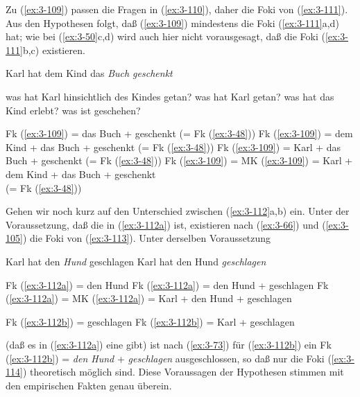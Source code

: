 \documentclass[output=paper]{langsci/langscibook}
\begin{document}
Zu (\ref{ex:3-109}) passen die Fragen in (\ref{ex:3-110}), daher die Foki von (\ref{ex:3-111}). Aus den
Hypothesen folgt, daß (\ref{ex:3-109}) mindestens die Foki (\ref{ex:3-111}a,d) hat; wie bei (\ref{ex:3-50}c,d) wird auch hier nicht vorausgesagt, daß die
Foki (\ref{ex:3-111}b,c) existieren.
\begin{exe}
\ex
\label{ex:3-109}
Karl hat dem Kind das \textit{Buch geschenkt}
\ex
\label{ex:3-110}
\begin{xlist}
\ex
\label{ex:3-110a}
was hat Karl hinsichtlich des Kindes getan?
\ex
\label{ex:3-110b}
was hat Karl getan?
\ex
\label{ex:3-110c}
was hat das Kind erlebt?
\ex
\label{ex:3-110d}
was ist geschehen?
\end{xlist}
\ex
\label{ex:3-111}
\begin{xlist}
\ex
\label{ex:3-111a}
Fk (\ref{ex:3-109}) = das Buch + geschenkt (= Fk (\ref{ex:3-48}))
\ex
\label{ex:3-111b}
Fk (\ref{ex:3-109}) = dem Kind + das Buch + geschenkt (= Fk (\ref{ex:3-48}))
\ex
\label{ex:3-111c}
Fk (\ref{ex:3-109}) = Karl + das Buch + geschenkt (= Fk (\ref{ex:3-48}))
\ex
\label{ex:3-111d}
Fk (\ref{ex:3-109}) = MK (\ref{ex:3-109}) = Karl + dem Kind + das Buch + geschenkt\\
 (= Fk (\ref{ex:3-48}))
\end{xlist}
\end{exe}
Gehen wir noch kurz auf den Unterschied zwischen (\ref{ex:3-112}a,b) ein. Unter
der Voraussetzung, daß die  in (\ref{ex:3-112a})  ist,
existieren nach (\ref{ex:3-66}) und (\ref{ex:3-105}) die Foki von (\ref{ex:3-113}). Unter derselben
Voraussetzung
\begin{exe}
\ex
\label{ex:3-112}
\begin{xlist}
\ex
\label{ex:3-112a}
Karl hat den \textit{Hund} geschlagen
\ex
\label{ex:3-112b}
Karl hat den Hund \textit{geschlagen}
\end{xlist}
\ex
\pagebreak
\label{ex:3-113}
\begin{xlist}
\ex
\label{ex:3-113a}
Fk (\ref{ex:3-112a}) = den Hund
\ex
\label{ex:3-113b}
Fk (\ref{ex:3-112a}) = den Hund + geschlagen
\ex
\label{ex:3-113c}
Fk (\ref{ex:3-112a}) = MK (\ref{ex:3-112a}) = Karl + den Hund + geschlagen
\end{xlist}
\ex
\label{ex:3-114}
\begin{xlist}
\ex
\label{ex:3-114a}
Fk (\ref{ex:3-112b}) = geschlagen
\ex
\label{ex:3-114b}
Fk (\ref{ex:3-112b}) = Karl + geschlagen
\end{xlist}
\end{exe}
(daß es in (\ref{ex:3-112a}) eine  gibt) ist nach (\ref{ex:3-73}) für (\ref{ex:3-112b}) ein  Fk (\ref{ex:3-112b}) = \textit{den Hund} + \textit{geschlagen}
ausgeschlossen, so daß nur die Foki (\ref{ex:3-114}) theoretisch möglich
sind. Diese Voraussagen der Hypothesen stimmen mit den empirischen
Fakten genau überein.\\
\end{document}
